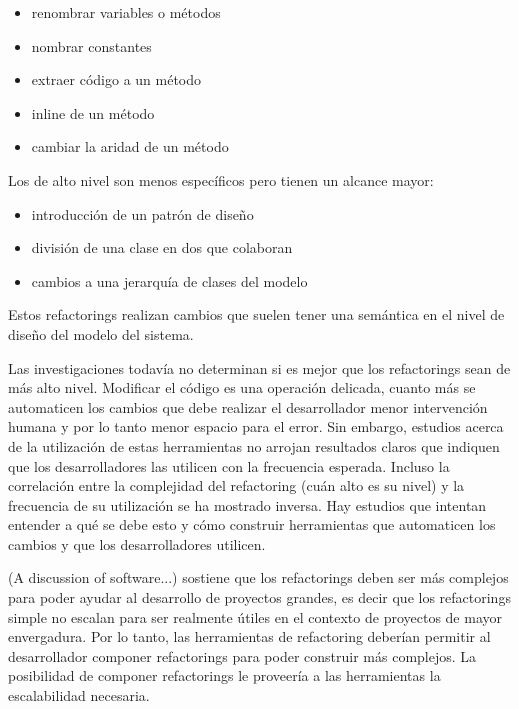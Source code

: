 \begin{itemize}
    \item renombrar variables o métodos
    \item nombrar constantes
    \item extraer código a un método
    \item inline de un método
    \item cambiar la aridad de un método
\end{itemize}

Los de alto nivel son menos específicos pero tienen un alcance mayor:

\begin{itemize}
    \item introducción de un patrón de diseño
    \item división de una clase en dos que colaboran
    \item cambios a una jerarquía de clases del modelo
\end{itemize}

Estos refactorings realizan cambios que suelen tener una semántica en el nivel de diseño del modelo
del sistema.

Las investigaciones todavía no determinan si es mejor que los refactorings sean de más alto nivel.
Modificar el código es una operación delicada, cuanto más se automaticen los cambios que debe
realizar el desarrollador menor intervención humana y por lo tanto menor espacio para el error. Sin
embargo, estudios acerca de la utilización de estas herramientas no arrojan resultados claros que
indiquen que los desarrolladores las utilicen con la frecuencia esperada. Incluso la correlación
entre la complejidad del refactoring (cuán alto es su nivel) y la frecuencia de su utilización se ha
mostrado inversa. Hay estudios que intentan entender a qué se debe esto y cómo construir
herramientas que automaticen los cambios y que los desarrolladores utilicen.

(A discussion of software...) sostiene que los refactorings deben ser más complejos para poder
ayudar al desarrollo de proyectos grandes, es decir que los refactorings simple no escalan para ser
realmente útiles en el contexto de proyectos de mayor envergadura. Por lo tanto, las herramientas de
refactoring deberían permitir al desarrollador componer refactorings para poder construir más
complejos. La posibilidad de componer refactorings le proveería a las herramientas la escalabilidad
necesaria.

